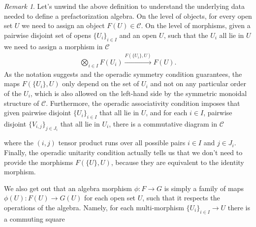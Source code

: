 \documentclass[12pt,a4paper]{article}
\newcounter{counter} \numberwithin{counter}{section}
\theoremstyle{definition}
\theoremstyle{plain}
\theoremstyle{remark}
\newtheorem{remark}[counter]{Remark}
\newcommand{\catC}{\mathscr{C}}
\begin{document}
\begin{remark}
    Let's unwind the above definition to understand the underlying data needed to define a prefactorization algebra. On the level of objects, for every open set $U$ we need to assign an object $F(U) \in \catC$. On the level of morphisms, given a pairwise disjoint set of opens $\{U_i\}_{i \in I}$ and an open $U$, such that the $U_i$ all lie in $U$ we need to assign a morphism in $\catC$
    \begin{align}
        \bigotimes_{i \in I} F(U_i) \xrightarrow{F(\{U_i\},U)} F(U).
    \end{align}
    As the notation suggests and the operadic symmetry condition guarantees, the maps $F(\{U_i\},U)$ only depend on the set of $U_i$ and not on any particular order of the $U_i$, which is also allowed on the left-hand side by the symmetric monoidal structure of $\catC$. Furthermore, the operadic associativity condition imposes that given pairwise disjoint $\{U_i\}_{i \in I}$ that all lie in $U$, and for each $i \in I$, pairwise disjoint $\{ V_{i, j}\}_{j \in J_i}$ that all lie in $U_i$, there is a commutative diagram in $\catC$
    \begin{center}
    \end{center}
    where the $(i,j)$ tensor product runs over all possible pairs $i \in I$ and $j \in J_i$. Finally, the operadic unitarity condition actually tells us that we don't need to provide the morphisms $F(\{U\}, U)$, because they are equivalent to the identity morphism.

    We also get out that an algebra morphism $\phi: F \rightarrow G$ is simply a family of maps $\phi(U): F(U) \rightarrow G(U)$ for each open set $U$, such that it respects the operations of the algebra. Namely, for each multi-morphism $\{ U_i \}_{i \in I} \rightarrow U$ there is a commuting square
    \begin{center}
    \end{center}

\end{remark}
\end{document}
